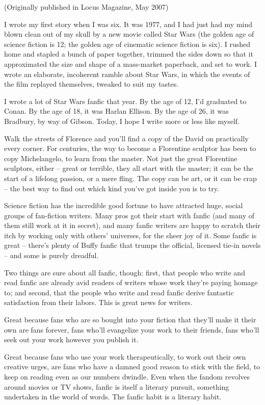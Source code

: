 (Originally published in Locus Magazine, May 2007)

I wrote my first story when I was six. It was 1977, and I had just
had my mind blown clean out of my skull by a new movie called Star
Wars (the golden age of science fiction is 12; the golden age of
cinematic science fiction is six). I rushed home and stapled a
bunch of paper together, trimmed the sides down so that it
approximated the size and shape of a mass-market paperback, and set
to work. I wrote an elaborate, incoherent ramble about Star Wars,
in which the events of the film replayed themselves, tweaked to
suit my tastes.

I wrote a lot of Star Wars fanfic that year. By the age of 12, I'd
graduated to Conan. By the age of 18, it was Harlan Ellison. By the
age of 26, it was Bradbury, by way of Gibson. Today, I hope I write
more or less like myself.

Walk the streets of Florence and you'll find a copy of the David on
practically every corner. For centuries, the way to become a
Florentine sculptor has been to copy Michelangelo, to learn from
the master. Not just the great Florentine sculptors, either --
great or terrible, they all start with the master; it can be the
start of a lifelong passion, or a mere fling. The copy can be art,
or it can be crap -- the best way to find out which kind you've got
inside you is to try.

Science fiction has the incredible good fortune to have attracted
huge, social groups of fan-fiction writers. Many pros got their
start with fanfic (and many of them still work at it in secret),
and many fanfic writers are happy to scratch their itch by working
only with others' universes, for the sheer joy of it. Some fanfic
is great -- there's plenty of Buffy fanfic that trumps the
official, licensed tie-in novels -- and some is purely dreadful.

Two things are sure about all fanfic, though: first, that people
who write and read fanfic are already avid readers of writers whose
work they're paying homage to; and second, that the people who
write and read fanfic derive fantastic satisfaction from their
labors. This is great news for writers.

Great because fans who are so bought into your fiction that they'll
make it their own are fans forever, fans who'll evangelize your
work to their friends, fans who'll seek out your work however you
publish it.

Great because fans who use your work therapeutically, to work out
their own creative urges, are fans who have a damned good reason to
stick with the field, to keep on reading even as our numbers
dwindle. Even when the fandom revolves around movies or TV shows,
fanfic is itself a literary pursuit, something undertaken in the
world of words. The fanfic habit is a literary habit.

